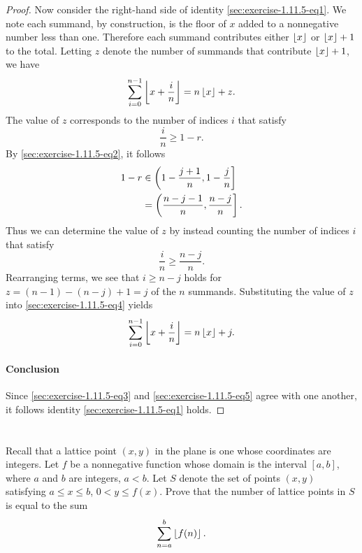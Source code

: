 \documentclass{report}
\begin{document}
\begin{proof}
    Now consider the right-hand side of identity
      \eqref{sec:exercise-1.11.5-eq1}.
    We note each summand, by construction, is the floor of $x$ added to a
      nonnegative number less than one.
    Therefore each summand contributes either $\left\lfloor x\right\rfloor$ or $\left\lfloor x\right\rfloor + 1$ to
      the total.
    Letting $z$ denote the number of summands that contribute $\left\lfloor x\right\rfloor + 1$,
      we have
      \begin{equation}
        \label{sec:exercise-1.11.5-eq4}
        \sum_{i=0}^{n-1} \left\lfloor x + \frac{i}{n}\right\rfloor = n\left\lfloor x\right\rfloor + z.
      \end{equation}
    The value of $z$ corresponds to the number of indices $i$ that satisfy
      $$\frac{i}{n} \geq 1 - r.$$
    By \eqref{sec:exercise-1.11.5-eq2}, it follows
      \begin{align*}
        1 - r
          & \in \left(1 - \frac{j+1}{n}, 1-\frac{j}{n}\right] \\
          & = \left(\frac{n - j - 1}{n}, \frac{n - j}{n}\right].
      \end{align*}
    Thus we can determine the value of $z$ by instead counting the number of
      indices $i$ that satisfy $$\frac{i}{n} \geq \frac{n - j}{n}.$$
    Rearranging terms, we see that $i \geq n - j$ holds for
      $z = (n - 1) - (n - j) + 1 = j$ of the $n$ summands.
    Substituting the value of $z$ into \eqref{sec:exercise-1.11.5-eq4} yields
      \begin{equation}
        \label{sec:exercise-1.11.5-eq5}
        \sum_{i=0}^{n-1} \left\lfloor x + \frac{i}{n}\right\rfloor = n\left\lfloor x\right\rfloor + j.
      \end{equation}

  \paragraph{Conclusion}%

    Since \eqref{sec:exercise-1.11.5-eq3} and \eqref{sec:exercise-1.11.5-eq5}
      agree with one another, it follows identity
      \eqref{sec:exercise-1.11.5-eq1} holds.

\end{proof}

\section{}%
\label{sec:exercise-1.11.6}

Recall that a lattice point $(x, y)$ in the plane is one whose coordinates are
  integers.
Let $f$ be a nonnegative function whose domain is the interval $[a, b]$, where
  $a$ and $b$ are integers, $a < b$.
Let $S$ denote the set of points $(x, y)$ satisfying $a \leq x \leq b$,
  $0 < y \leq f(x)$.
Prove that the number of lattice points in $S$ is equal to the sum
  $$\sum_{n=a}^b \left\lfloor f(n)\right\rfloor.$$
\end{document}
